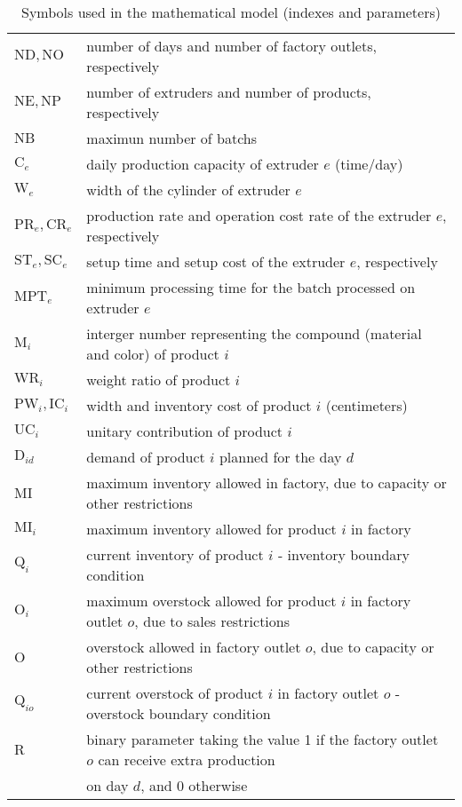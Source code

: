 \begin{table}[h!]
\begin{center}
\begin{tabular}{ l l }
		$\mathrm{ND}, \mathrm{NO}$ & number of days and number of factory outlets, respectively\\
		$\mathrm{NE}, \mathrm{NP}$ & number of extruders and number of products, respectively \\ 
		$\mathrm{NB}$ & maximun number of batchs \\ 
		$\mathrm{C}_e$ & daily production capacity of extruder $e$ (time/day)\\ 
		$\mathrm{W}_e$ & width of the cylinder of extruder $e$ \\ 
		$\mathrm{PR}_e, \mathrm{CR}_e$ & production rate and operation cost rate of the extruder $e$, respectively \\ 
		$\mathrm{ST}_e, \mathrm{SC}_e$ & setup time and setup cost of the extruder $e$, respectively\\ 
		$\mathrm{MPT}_e$ & minimum processing time for the batch processed on extruder $e$ \\ 
		$\mathrm{M}_i$ & interger number representing the compound (material and color) of product $i$ \\ 
		$\mathrm{WR}_i$ & weight ratio of product $i$ \\ 
		$\mathrm{PW}_i, \mathrm{IC}_i$ & width and inventory cost of product $i$ (centimeters) \\ 
		$\mathrm{UC}_i$ & unitary contribution of product $i$ \\ 
		$\mathrm{D}_{id}$ & demand of product $i$ planned for the day $d$ \\ 
		$\mathrm{MI}$ & maximum inventory allowed in factory, due to capacity or other restrictions \\ 
		$\mathrm{MI}_i$ & maximum inventory allowed for product $i$ in factory \\ 
		$\mathrm{Q}_i$ & current inventory of product $i$ - inventory boundary condition \\ 
		$\mathrm{O}_i$ & maximum overstock allowed for product $i$ in factory outlet $o$, due to sales restrictions \\ 
		$\mathrm{O}$ & overstock allowed in factory outlet $o$, due to capacity or other restrictions  \\ 
		$\mathrm{Q}_{io}$ & current overstock of product $i$ in factory outlet $o$ - overstock boundary condition \\ 
		$\mathrm{R}$ & binary parameter taking the value 1 if the factory outlet $o$ can receive extra production \\ 
		             & on day $d$, and 0 otherwise \\ 
	\end{tabular}
\caption{Symbols used in the mathematical model (indexes and parameters)}
\label{tab:symbols1}
\end{center}
\end{table}

